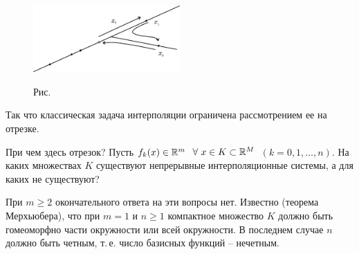  \bigskip
\begin{figure}[h]
\begin{center}
\includegraphics[width=0.5\textwidth]{pict/pict01-6.eps}
\end{center}
 \bigskip
 \label{r1-6}

 \centerline{Рис.~\theris}
 \bigskip
\end{figure}



\noindent
Так что классическая задача интерполяции ограничена
рассмотрением ее на отрезке.

\begin{task}
При чем здесь отрезок? Пусть {$f_k(x) \in \mathbb{R}^m$}\  $\forall\ x \in K \subset
\mathbb{R}^M$\ {$(k=0,1,\ldots,n).$} На каких множествах $K$ существуют
непрерывные интерполяционные системы, а для каких не существуют?
\end{task}

При $m \ge 2$ окончательного ответа на эти вопросы нет. Известно (теорема
Мерхьюбера), что при $m=1$ и $n \ge 1$ компактное множество $K$ должно быть гомеоморфно
части
{окружности или всей окружности.
В последнем случае $n$ должно быть четным, т.\,е.} {число базисных функций -- нечетным.
}
